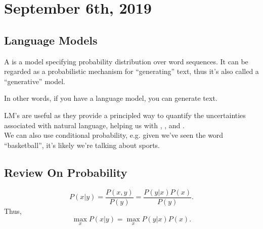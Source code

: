 \documentclass[../main/main.tex]{subfiles}
\begin{document}
\section{September  6th, 2019}
\subsection{Language Models}
\begin{definition}
	A  is a model specifying probability distribution over word sequences. It can be regarded as a probabilistic mechanism for ``generating'' text, thus it's also called a ``generative'' model.
\end{definition}
\begin{remark}
	In other words, if you have a language model, you can generate text.
\end{remark}
LM's are useful as they provide a principled way to quantify the uncertainties associated with natural language, helping us with , , and .\\

We can also use conditional probability, e.g. given we've seen the word ``basketball'', it's likely we're talking about sports.\\

\subsection{Review On Probability}

\[
	P(x|y)=\frac{P(x,y)}{P(y)}=\frac{P(y|x)P(x)}{P(y)}
.\] 
Thus,
\[
	\max_x P(x|y)=\max_x P(y|x)P(x)
.\] 
\end{document}
